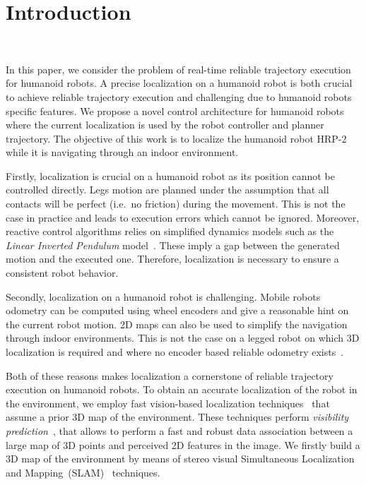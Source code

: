 \section{Introduction}~\label{sec:introduction}

In this paper, we consider the problem of real-time reliable
trajectory execution for humanoid robots. A precise localization on a
humanoid robot is both crucial to achieve reliable trajectory
execution and challenging due to humanoid robots specific features. We
propose a novel control architecture for humanoid robots where the
current localization is used by the robot controller and planner
trajectory. The objective of this work is to localize the humanoid robot
HRP-2~\cite{Kaneko04icra} while it is navigating through an indoor
environment.

Firstly, localization is crucial on a humanoid robot as its position
cannot be controlled directly. Legs motion are planned under the
assumption that all contacts will be perfect (i.e.\ no friction)
during the movement. This is not the case in practice and leads to
execution errors which cannot be ignored. Moreover, reactive control
algorithms relies on simplified dynamics models such as the
\textit{Linear Inverted Pendulum} model~\cite{Kajita01iros}. These
imply a gap between the generated motion and the executed
one. Therefore, localization is necessary to ensure a consistent robot
behavior.

Secondly, localization on a humanoid robot is challenging. Mobile
robots odometry can be computed using wheel encoders and give a
reasonable hint on the current robot motion. 2D maps can also be used
to simplify the navigation through indoor environments. This is not
the case on a legged robot on which 3D localization is required and
where no encoder based reliable odometry exists~\citep{Hornung10iros}.

Both of these reasons makes localization a cornerstone of reliable
trajectory execution on humanoid robots. To obtain an accurate
localization of the robot in the environment, we employ fast
vision-based localization techniques~\cite{Alcantarilla10icra} that
assume a prior 3D map of the environment. These techniques perform
\textit{visibility prediction}~\cite{Alcantarilla11icra}, that allows
to perform a fast and robust data association between a large map of
3D points and perceived 2D features in the image. We firstly build a
3D map of the environment by means of stereo visual Simultaneous
Localization and Mapping~(SLAM)~\cite{Davison07pami,Konolige08tro}
techniques.

